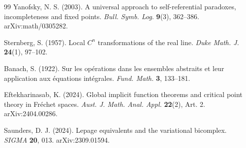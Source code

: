 \documentclass[12pt,letterpaper]{article}
\theoremstyle{definition}
\begin{document}
\begin{thebibliography}{99}
Yanofsky, N. S. (2003). A universal approach to self-referential paradoxes, incompleteness and fixed points. \emph{Bull. Symb. Log.} \textbf{9}(3), 362--386. arXiv:math/0305282.

Sternberg, S. (1957). Local $C^n$ transformations of the real line. \emph{Duke Math. J.} \textbf{24}(1), 97--102.

Banach, S. (1922). Sur les op\'erations dans les ensembles abstraits et leur application aux \'equations int\'egrales. \emph{Fund. Math.} \textbf{3}, 133--181.

Eftekharinasab, K. (2024). Global implicit function theorems and critical point theory in Fr\'echet spaces. \emph{Aust. J. Math. Anal. Appl.} \textbf{22}(2), Art. 2. arXiv:2404.00286.

Saunders, D. J. (2024). Lepage equivalents and the variational bicomplex. \emph{SIGMA} \textbf{20}, 013. arXiv:2309.01594.

\end{thebibliography}
\end{document}
